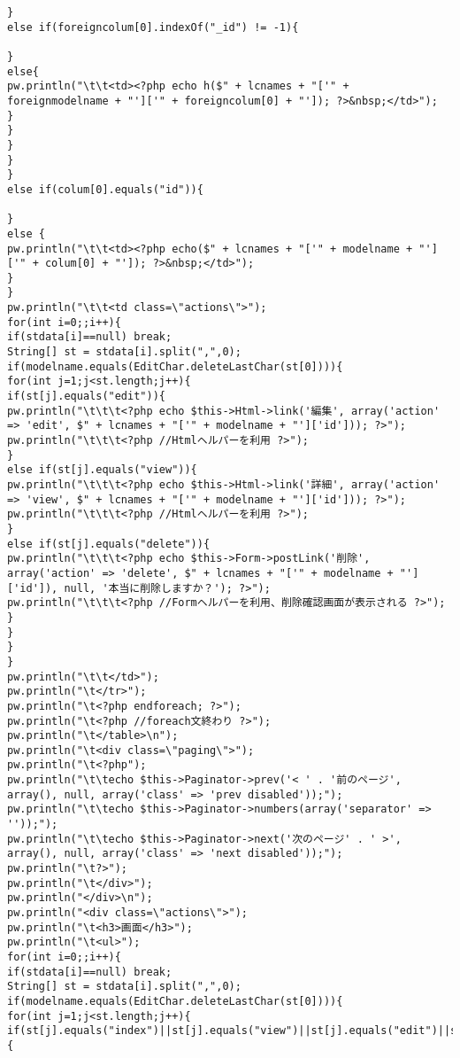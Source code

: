 \documentclass{funthesis}
\begin{document}
\begin{lstlisting}[caption=WriteView.java,label=1]
}
else if(foreigncolum[0].indexOf("_id") != -1){

}
else{
pw.println("\t\t<td><?php echo h($" + lcnames + "['" + foreignmodelname + "']['" + foreigncolum[0] + "']); ?>&nbsp;</td>");
}
}
}
}
}
else if(colum[0].equals("id")){

}
else {
pw.println("\t\t<td><?php echo($" + lcnames + "['" + modelname + "']['" + colum[0] + "']); ?>&nbsp;</td>");
}
}
pw.println("\t\t<td class=\"actions\">");
for(int i=0;;i++){
if(stdata[i]==null) break;
String[] st = stdata[i].split(",",0);
if(modelname.equals(EditChar.deleteLastChar(st[0]))){
for(int j=1;j<st.length;j++){
if(st[j].equals("edit")){
pw.println("\t\t\t<?php echo $this->Html->link('編集', array('action' => 'edit', $" + lcnames + "['" + modelname + "']['id'])); ?>");
pw.println("\t\t\t<?php //Htmlヘルパーを利用 ?>");
}
else if(st[j].equals("view")){
pw.println("\t\t\t<?php echo $this->Html->link('詳細', array('action' => 'view', $" + lcnames + "['" + modelname + "']['id'])); ?>");
pw.println("\t\t\t<?php //Htmlヘルパーを利用 ?>");	
}
else if(st[j].equals("delete")){
pw.println("\t\t\t<?php echo $this->Form->postLink('削除', array('action' => 'delete', $" + lcnames + "['" + modelname + "']['id']), null, '本当に削除しますか？'); ?>");
pw.println("\t\t\t<?php //Formヘルパーを利用、削除確認画面が表示される ?>");
}
}
}
}
pw.println("\t\t</td>");
pw.println("\t</tr>");
pw.println("\t<?php endforeach; ?>");
pw.println("\t<?php //foreach文終わり ?>");
pw.println("\t</table>\n");
pw.println("\t<div class=\"paging\">");
pw.println("\t<?php");
pw.println("\t\techo $this->Paginator->prev('< ' . '前のページ', array(), null, array('class' => 'prev disabled'));");
pw.println("\t\techo $this->Paginator->numbers(array('separator' => ''));");
pw.println("\t\techo $this->Paginator->next('次のページ' . ' >', array(), null, array('class' => 'next disabled'));");
pw.println("\t?>");
pw.println("\t</div>");
pw.println("</div>\n");
pw.println("<div class=\"actions\">");
pw.println("\t<h3>画面</h3>");
pw.println("\t<ul>");
for(int i=0;;i++){
if(stdata[i]==null) break;
String[] st = stdata[i].split(",",0);
if(modelname.equals(EditChar.deleteLastChar(st[0]))){
for(int j=1;j<st.length;j++){
if(st[j].equals("index")||st[j].equals("view")||st[j].equals("edit")||st[j].equals("delete")){


\end{lstlisting}
\end{document}
